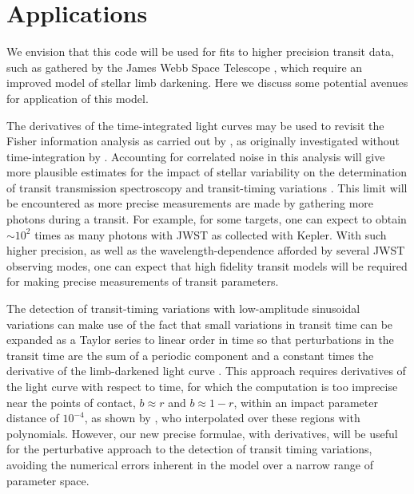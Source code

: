 \documentclass[modern,trackchanges]{aastex63}
\begin{document}

\section{Applications}
\label{sec:applications}

We envision that this code will be used for fits to higher precision
transit data, such as gathered by the James Webb Space Telescope \citep[JWST;][]{Beichman2014},
which require an improved model of stellar limb darkening.  Here we discuss
some potential avenues for application of this model.

The derivatives of the time-integrated light curves may be used to revisit the
Fisher information analysis as carried out by \citet{Price2014}, as originally
investigated without time-integration by \citet{Carter2008}.  Accounting
for correlated noise in this analysis will give more plausible estimates
for the impact of stellar variability on the determination of transit
transmission spectroscopy and transit-timing variations \citep{ForemanMackey2017}.
This limit will be encountered as more precise measurements are made by gathering
more photons during a transit.  For example, for some targets, one can expect to
obtain $\sim 10^2$ times as many photons with JWST as collected with Kepler.
With such higher precision, as well as the wavelength-dependence afforded
by several JWST observing modes, one can expect that high fidelity transit
models will be required for making precise measurements of transit parameters.

The detection of transit-timing variations with low-amplitude sinusoidal
variations can make use of the fact that small variations in transit time
can be expanded as a Taylor series to linear order in time so that perturbations
in the transit time are the sum of a periodic component and a constant
times the derivative of the limb-darkened light curve \citep{Ofir2018}.
This approach requires derivatives of the light curve with respect to
time, for which the \citet{MandelAgol2002} computation is too
imprecise near the points of contact, $b \approx r$ and $b \approx 1-r$,
within an impact parameter distance of $10^{-4}$, as shown by \citet{Ofir2018},
who interpolated over these regions with polynomials.
However, our new precise formulae, with derivatives, will be useful
for the perturbative approach to the detection of transit timing
variations, avoiding the numerical errors inherent in the \citet{MandelAgol2002}
model over a narrow range of parameter space.
\end{document}
